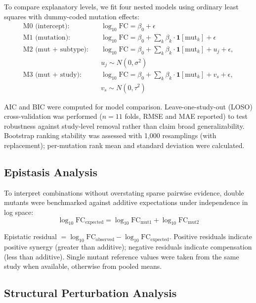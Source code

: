 \documentclass[12pt,a4paper]{article}
\begin{document}
To compare explanatory levels, we fit four nested models using ordinary least squares with dummy-coded mutation effects:
\begin{align}
\text{M0 (intercept):} &\quad \log_{10}\text{FC} = \beta_0 + \epsilon \\
\text{M1 (mutation):} &\quad \log_{10}\text{FC} = \beta_0 + \sum_k \beta_k \cdot \mathbf{1}[\text{mut}_k] + \epsilon \\
\text{M2 (mut + subtype):} &\quad \log_{10}\text{FC} = \beta_0 + \sum_k \beta_k \cdot \mathbf{1}[\text{mut}_k] + u_j + \epsilon, \\
&\quad u_j \sim N(0, \sigma^2) \\
\text{M3 (mut + study):} &\quad \log_{10}\text{FC} = \beta_0 + \sum_k \beta_k \cdot \mathbf{1}[\text{mut}_k] + v_s + \epsilon, \\
&\quad v_s \sim N(0, \tau^2)
\end{align}

AIC and BIC were computed for model comparison. Leave-one-study-out (LOSO) cross-validation was performed ($n=11$ folds, RMSE and MAE reported) to test robustness against study-level removal rather than claim broad generalizability. Bootstrap ranking stability was assessed with 1,000 resamplings (with replacement); per-mutation rank mean and standard deviation were calculated.

\subsection{Epistasis Analysis}

To interpret combinations without overstating sparse pairwise evidence, double mutants were benchmarked against additive expectations under independence in log space:
\begin{equation}
\log_{10}\text{FC}_{\text{expected}} = \log_{10}\text{FC}_{\text{mut1}} + \log_{10}\text{FC}_{\text{mut2}}
\end{equation}

Epistatic residual $= \log_{10}\text{FC}_{\text{observed}} - \log_{10}\text{FC}_{\text{expected}}$. Positive residuals indicate positive synergy (greater than additive); negative residuals indicate compensation (less than additive). Single mutant reference values were taken from the same study when available, otherwise from pooled means.

\subsection{Structural Perturbation Analysis}
\end{document}
